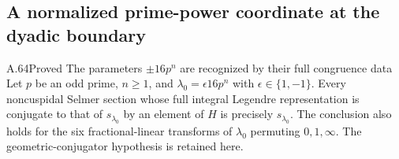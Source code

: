 \subsection{A normalized prime-power coordinate at the dyadic boundary}

\begin{statement}{A.64}{Proved}
{The parameters $\pm16p^n$ are recognized by their full congruence data}
Let $p$ be an odd prime, $n\ge1$, and
$\lambda_0=\epsilon16p^n$ with $\epsilon\in\{1,-1\}$.
Every noncuspidal Selmer section whose full integral Legendre
representation is conjugate to that of $s_{\lambda_0}$ by an
element of $H$ is precisely $s_{\lambda_0}$.
The conclusion also holds for the six fractional-linear
transforms of $\lambda_0$ permuting $0,1,\infty$.
The geometric-conjugator hypothesis is retained here.
\end{statement}
